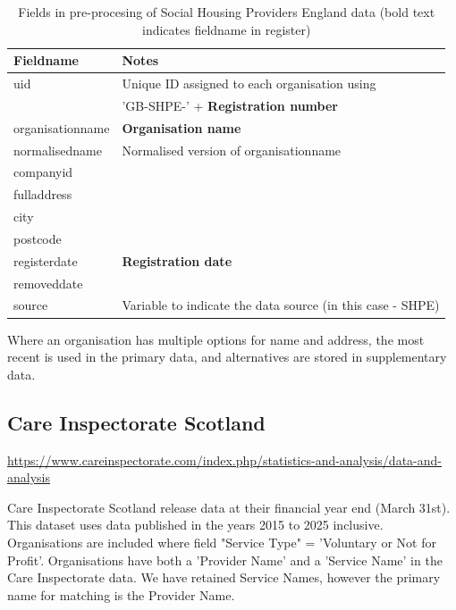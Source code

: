 \documentclass{article}
\begin{document}
\begin{table}[h]
  \centering
  \begin{tabularx}{\textwidth}{|l|X|}
    \hline
    Fieldname  &	Notes \\
    \hline \hline
uid & Unique ID assigned to each organisation using \\
&'GB-SHPE-' + \textbf{Registration number}\\ \hline
organisationname & \textbf{Organisation name} \\ \hline
normalisedname & Normalised version of organisationname\\ \hline
companyid &  \\ \hline
fulladdress &  \\ \hline
city & \\ \hline
postcode & \\ \hline
registerdate & \textbf{Registration date} \\ \hline
removeddate & \\ \hline
source & Variable to indicate the data source (in this case - SHPE) \\ \hline
\hline 
\end{tabularx}
  \caption{Fields in pre-procesing of Social Housing Providers England data (bold text indicates fieldname in register)}
  \label{tab:shpe_preprocess}
  
\end{table}
Where an organisation has multiple options for name and address, the most recent
is used in the primary data, and alternatives are stored in supplementary data.


\clearpage
\subsection{Care Inspectorate Scotland }
\url{https://www.careinspectorate.com/index.php/statistics-and-analysis/data-and-analysis}

Care Inspectorate Scotland release data at their financial year end (March 31st). This dataset uses data published in the
years 2015 to 2025 inclusive.
Organisations are included where field "Service Type" =  'Voluntary or Not for Profit'. Organisations
have both a 'Provider Name' and a 'Service Name' in the Care Inspectorate data. We have retained
Service Names, however the primary name for matching is the Provider Name.
\end{document}
